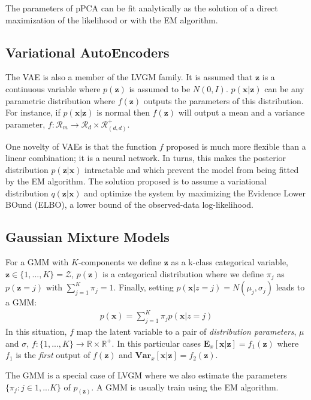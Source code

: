 \documentclass{article}
\newcommand{\Vx}{\textbf{Var}_x}
\newcommand{\Ex}{\textbf{E}_x}
\newcommand{\x}{\mathbf{x}}
\newcommand{\z}{\mathbf{z}}
\begin{document}
\bigskip

The parameters of pPCA can be fit analytically as the solution of a direct maximization of the likelihood or with the EM algorithm.   

\subsection{Variational AutoEncoders}

The VAE is also a member of the LVGM family. It is assumed that $\z$ is a continuous variable where $p(\z)$ is assumed to be $N(0,I)$. $p(\x|\z)$ can be any parametric distribution where $f(\z)$ outputs the parameters of this distribution. For instance, if $p(\x|\z)$ is normal then $f(\z)$ will output a mean and a variance parameter, $f: \mathcal{R}_m \rightarrow \mathcal{R}_d \times \mathcal{R}_(d,d)^+$.

\bigskip

One novelty of VAEs is that the function $f$ proposed is much more flexible than a linear combination; it is a neural network.  In turns, this makes the posterior distribution $p(\z|\x)$ intractable and which prevent the model from being fitted by the EM algorithm. The solution proposed is to assume a variational distribution $q(\z|\x)$ and optimize the system by maximizing the Evidence Lower BOund (ELBO), a lower bound of the observed-data log-likelihood.

\subsection{Gaussian Mixture Models}

For a GMM with $K$-components we define $\z$ as a k-class categorical variable, $\z \in \{1,...,K\} = \mathcal{Z}$, $p(\z)$ is a categorical distribution where we define $\pi_j$ as $p(\z = j)$ with $\sum_{j=1}^K \pi_j =1$. Finally, setting $p(\x|z=j) = N(\mu_j,\sigma_j)$ leads to a GMM:
\begin{align}
p(\x) = \sum_{j=1}^K \pi_j p(\x|z=j) 
\label{LVM}
\end{align}
In this situation, $f$ map the latent variable to a pair of \textit{distribution parameters}, $\mu$ and $\sigma$, $f: \{1,...,K\} \rightarrow \mathbb{R}\times\mathbb{R}^+$. In this particular cases  $\Ex[\x|\z] = f_1(\z)$ where $f_1$ is the \textit{first} output of $f(\z)$ and $\Vx[\x|\z] = f_2(\z)$.

\bigskip

The GMM is a special case of LVGM where we also estimate the parameters $\{\pi_j : j \in 1,...K\}$ of $p_(\z)$. A GMM is usually train using the EM algorithm. 
\end{document}
